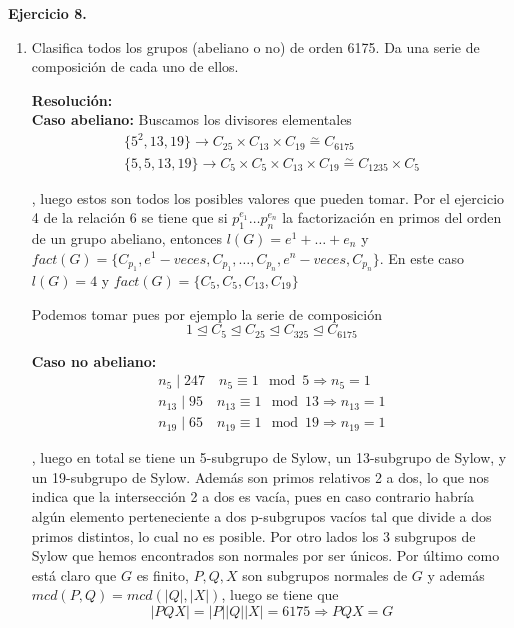 \documentclass{article}
\begin{document}
\textbf{Ejercicio 8.} 
\begin{enumerate}
\item Clasifica todos los grupos (abeliano o no) de orden 6175. Da una serie de composición de cada uno de ellos.

\textbf{Resolución:}\\

\textbf{Caso abeliano:} Buscamos los divisores elementales
\begin{gather*}
\{5^2,13,19\}\longrightarrow C_{25}\times C_{13}\times C_{19}\overset{\sim}{=} C_{6175}\\
\{5,5,13,19\}\longrightarrow C_{5}\times C_5\times C_{13}\times C_{19}\overset{\sim}{=} C_{1235}\times C_5
\end{gather*} 

, luego estos son todos los posibles  valores que pueden tomar. Por el ejercicio 4 de la relación 6 se tiene que si $p_1^{e_1}\ldots p_n^{e_n}$ la factorización en primos del orden de un grupo abeliano, entonces $l(G)=e^1+\ldots+e_n$ y $fact(G)=\{C_{p_1},e^1-veces,C_{p_1},\ldots,C_{p_n},e^n-veces,C_{p_n}\}$. En este caso $l(G)=4$ y $fact(G)=\{C_5,C_5,C_{13},C_{19}\}$

Podemos tomar pues por ejemplo la serie de composición
\begin{equation*}
1\unlhd C_5\unlhd C_{25}\unlhd C_{325}\unlhd C_{6175}
\end{equation*}

\textbf{Caso no abeliano:}
\begin{gather*}
n_5\mid 247 \quad n_5\equiv 1\mod 5 \Rightarrow n_5=1\\
n_{13}\mid 95\quad n_{13}\equiv 1\mod 13 \Rightarrow n_{13}=1\\
n_{19}\mid 65\quad n_{19}\equiv 1\mod 19 \Rightarrow n_{19}=1
\end{gather*}

, luego en total se tiene un 5-subgrupo de Sylow, un 13-subgrupo de Sylow, y un 19-subgrupo de Sylow. Además son primos relativos 2 a dos, lo que nos indica que la intersección 2 a dos es vacía, pues en caso contrario habría algún elemento perteneciente a dos p-subgrupos vacíos tal que divide a dos primos distintos, lo cual no es posible. Por otro lados los 3 subgrupos de Sylow que hemos encontrados son normales por ser únicos. Por último como está claro que $G$ es finito, $P,Q,X$ son subgrupos normales de $G$ y además $mcd(P,Q)=mcd(|Q|,|X|)$, luego se tiene que
\begin{equation*}
|PQX|=|P||Q||X|=6175\Rightarrow PQX=G
\end{equation*}


\end{enumerate}
\end{document}

